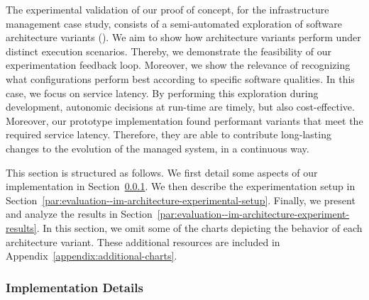 
The experimental validation of our proof of concept, for the infrastructure management case study, consists of a semi-automated exploration of software architecture variants (). We aim to show how architecture variants perform under distinct execution scenarios. Thereby, we demonstrate the feasibility of our experimentation feedback loop. Moreover, we show the relevance of recognizing what configurations perform best according to specific software qualities. In this case, we focus on service latency. By performing this exploration during development, autonomic decisions at run-time are timely, but also cost-effective. Moreover, our prototype implementation found performant variants that meet the required service latency. Therefore, they are able to contribute long-lasting changes to the evolution of the managed system, in a continuous way.

This section is structured as follows. We first detail some aspects of our implementation in Section~\ref{par:evaluation--im-architecture-experimental-implementation}. We then describe the experimentation setup in Section~\ref{par:evaluation--im-architecture-experimental-setup}. Finally, we present and analyze the results in Section~\ref{par:evaluation--im-architecture-experiment-results}. In this section, we omit some of the charts depicting the behavior of each architecture variant. These additional resources are included in Appendix~\ref{appendix:additional-charts}.

\subsubsection{Implementation Details}
\label{par:evaluation--im-architecture-experimental-implementation}


